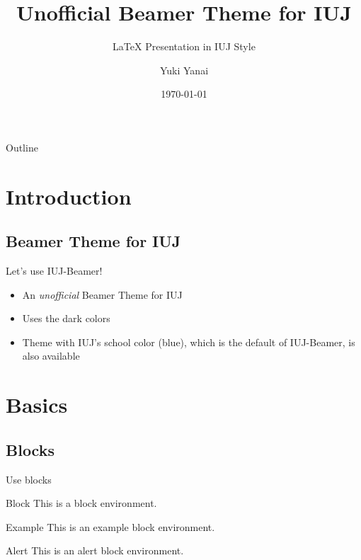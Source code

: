 \documentclass[dvipdfmx]{beamer}
\title{Unofficial Beamer Theme for IUJ}
\subtitle{{\LaTeX} Presentation in IUJ Style}
\author[Yanai]{Yuki Yanai}
\institute[IUJ]{Graduate School of International Relations}
\date{\today}
\begin{document}
\begin{frame}
 \maketitle
\end{frame}

\begin{frame}{Outline} 
  \tableofcontents
\end{frame}

\section{Introduction}

  \subsection{Beamer Theme for IUJ}

\begin{frame}{Let's use IUJ-Beamer!}
  \begin{itemize}
   \item An \textit{unofficial} Beamer Theme for IUJ
   \item Uses the dark colors
   \item Theme with IUJ's school color (blue), which is the default of
         IUJ-Beamer, is also available 
  \end{itemize}
\end{frame}





\section{Basics}


\subsection{Blocks}

\begin{frame}{Use blocks}
  \begin{block}{Block}
   This is a block environment.
  \end{block}
  \pause
  \begin{exampleblock}{Example}
   This is an example block environment.
  \end{exampleblock}
 \pause
  \begin{alertblock}{Alert}
   This is an alert block environment.
  \end{alertblock}
\end{frame}
\end{document}
